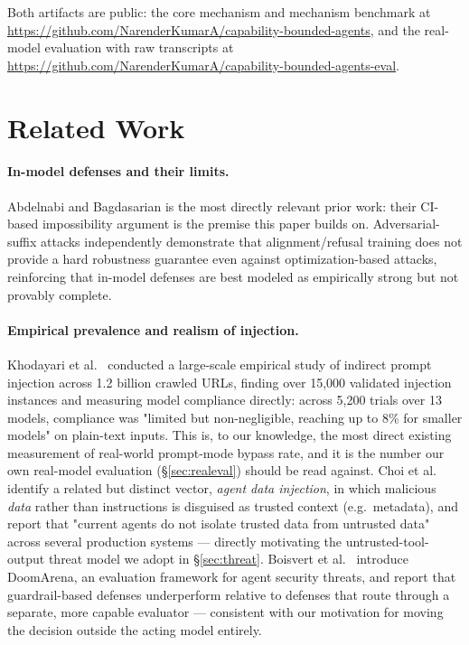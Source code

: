 \documentclass[11pt]{article}
\begin{document}
Both artifacts are public: the core mechanism and mechanism benchmark at
\url{https://github.com/NarenderKumarA/capability-bounded-agents}, and the real-model
evaluation with raw transcripts at
\url{https://github.com/NarenderKumarA/capability-bounded-agents-eval}.

\section{Related Work}
\label{sec:related}

\paragraph{In-model defenses and their limits.} Abdelnabi and Bagdasarian
\citep{abdelnabi2026agents} is the most directly relevant prior work: their CI-based
impossibility argument is the premise this paper builds on. Adversarial-suffix attacks
\citep{zou2023universal} independently demonstrate that alignment/refusal training does not
provide a hard robustness guarantee even against optimization-based attacks, reinforcing
that in-model defenses are best modeled as empirically strong but not provably complete.

\paragraph{Empirical prevalence and realism of injection.} Khodayari et al.\
\citep{khodayari2026wild} conducted a large-scale empirical study of indirect prompt
injection across 1.2 billion crawled URLs, finding over 15{,}000 validated injection
instances and measuring model compliance directly: across 5{,}200 trials over 13 models,
compliance was "limited but non-negligible, reaching up to 8\% for smaller models" on
plain-text inputs. This is, to our knowledge, the most direct existing measurement of
real-world prompt-mode bypass rate, and it is the number our own real-model evaluation
(\S\ref{sec:realeval}) should be read against. Choi et al.\ \citep{choi2026agentdata}
identify a related but distinct vector, \emph{agent data injection}, in which malicious
\emph{data} rather than instructions is disguised as trusted context (e.g.\ metadata), and
report that "current agents do not isolate trusted data from untrusted data" across several
production systems — directly motivating the untrusted-tool-output threat model we adopt in
\S\ref{sec:threat}. Boisvert et al.\ \citep{boisvert2026doomarena} introduce DoomArena, an
evaluation framework for agent security threats, and report that guardrail-based defenses
underperform relative to defenses that route through a separate, more capable evaluator —
consistent with our motivation for moving the decision outside the acting model entirely.
\end{document}
